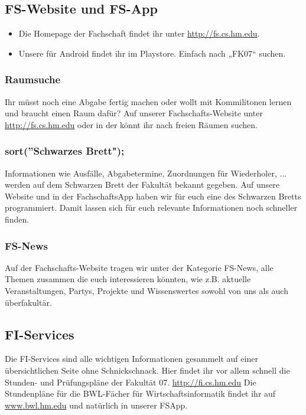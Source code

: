 \subsection{FS-Website und FS-App}
\begin{itemize}
	\item Die Homepage der Fachschaft findet ihr unter \url{http://fs.cs.hm.edu}.
	\item Unsere  für Android findet ihr im Playstore. 
	Einfach nach „FK07“ suchen.
\end{itemize}

\subsubsection{Raumsuche}
Ihr müsst noch eine Abgabe fertig machen oder wollt mit Kommilitonen 
lernen und braucht einen Raum dafür? Auf unserer Fachschafts-Website unter \url{http://fs.cs.hm.edu} \arrow {} \arrow {} oder in der
 könnt ihr nach freien Räumen suchen.

\subsubsection{sort(''Schwarzes Brett");}
Informationen wie Ausfälle, Abgabetermine, Zuordnungen für 
Wiederholer, ... werden auf dem Schwarzen Brett der Fakultät bekannt 
gegeben. Auf unsere Website und in der FachschaftsApp haben wir 
für euch eine  des Schwarzen Bretts 
programmiert. Damit lassen sich für euch relevante Informationen noch 
schneller finden. 

\subsubsection{FS-News}
Auf der Fachschafts-Website tragen wir unter der Kategorie FS-News, 
alle Themen zusammen die euch interessieren könnten, wie z.B. 
aktuelle Veranstaltungen, Partys, Projekte und Wissenswertes sowohl 
von uns als auch überfakultär. 


\subsection{FI-Services}
Die FI-Services sind alle wichtigen Informationen gesammelt auf einer 
übersichtlichen Seite ohne Schnickschnack. Hier findet ihr vor allem 
schnell die Stunden- und Prüfungspläne der Fakultät 07. 
\url{http://fi.cs.hm.edu}\doublebreak
Die Stundenpläne für die BWL-Fächer für Wirtschaftsinformatik 
findet ihr auf \url{www.bwl.hm.edu} \arrow {} und natürlich in unserer FSApp.

